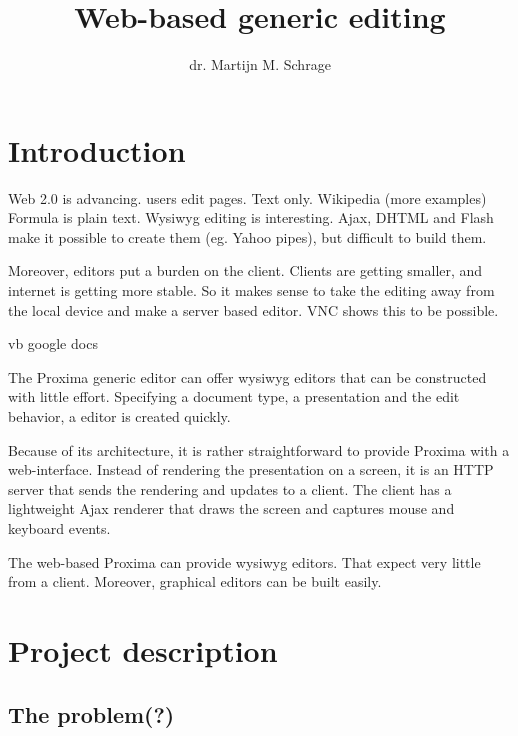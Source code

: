 \documentclass[10pt]{article}
\title{Web-based generic editing}
\author{dr. Martijn M. Schrage}
\date{\version}
\begin{document}
\maketitle

\section{Introduction}

Web 2.0 is advancing. users edit pages. Text only. Wikipedia (more examples) Formula is plain text. Wysiwyg editing is interesting. Ajax, DHTML and Flash make it possible to create them (eg. Yahoo pipes), but difficult to build them.

Moreover, editors put a burden on the client. Clients are getting smaller, and internet is getting more stable. So it makes sense to take the editing away from the local device and make a server based editor. VNC shows this to be possible.

vb google docs


The Proxima generic editor can offer wysiwyg editors that can be constructed with little effort. Specifying a document type, a presentation and the edit behavior, a editor is created quickly.

Because of its architecture, it is rather straightforward to provide Proxima with a web-interface. Instead of rendering the presentation on a screen, it is an HTTP server that sends the rendering and updates to a client. The client has a lightweight Ajax renderer that draws the screen and captures mouse and keyboard events.

The web-based Proxima can provide wysiwyg editors. That expect very little from a client. Moreover, graphical editors can be built easily. 



\section{Project description}

\subsection{The problem(?)} 
\end{document}
